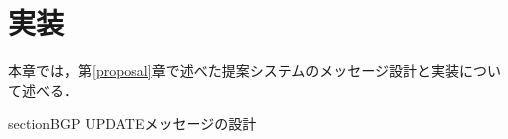 \chapter{実装}
\label{implementation}
本章では，第\ref{proposal}章で述べた提案システムのメッセージ設計と実装について述べる．

section{BGP UPDATEメッセージの設計}





